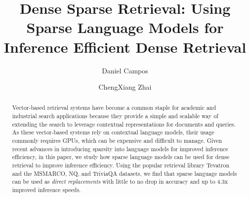 \documentclass[11pt]{article}
\begin{document}
\title{Dense Sparse Retrieval: Using Sparse Language Models for Inference Efficient Dense Retrieval}
\author[1]{Daniel Campos}
\author[1]{ChengXiang Zhai}
\maketitle
\begin{abstract}
Vector-based retrieval systems have become a common staple for academic and industrial search applications because they provide a simple and scalable way of extending the search to leverage contextual representations for documents and queries. As these vector-based systems rely on contextual language models,  their usage commonly requires GPUs, which can be expensive and difficult to manage. Given recent advances in introducing sparsity into language models for improved inference efficiency, in this paper, we study how sparse language models can be used for dense retrieval to improve inference efficiency. Using the popular retrieval library Tevatron and the MSMARCO, NQ, and TriviaQA datasets, we find that sparse language models can be used as \textit{direct replacements} with little to no drop in accuracy and up to 4.3x improved inference speeds. 
\end{abstract}
\end{document}
